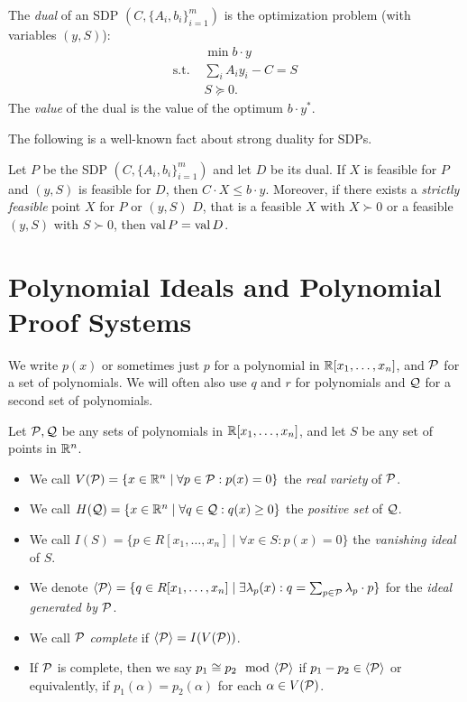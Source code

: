 \begin{definition}
The \emph{dual} of an SDP $(C, \{A_i, b_i\}_{i=1}^m)$ is the optimization problem (with variables $(y,S)$):
\begin{align*}
&\min b \cdot y \\
\text{s.t. }&\sum_i A_i y_i - C = S \\
&S \succeq 0.
\end{align*}
The \emph{value} of the dual is the value of the optimum $b \cdot y^*$.
\end{definition}
The following is a well-known fact about strong duality for SDPs.
\begin{lemma}\label{lem:duality}
Let $P$ be the SDP $(C, \{A_i, b_i\}_{i=1}^m)$ and let $D$ be its dual. If $X$ is feasible for $P$ and $(y,S)$ is feasible for $D$, then $C \cdot X \leq b \cdot y$. Moreover, if there exists a \emph{strictly feasible} point $X$ for $P$ or $(y,S)$ $D$, that is a feasible $X$ with $X \succ 0$ or a feasible $(y,S)$ with $S \succ 0$, then $\operatorname{val}{P} = \operatorname{val}{D}$.
\end{lemma}

\section{Polynomial Ideals and Polynomial Proof Systems}\label{sec:polyproofs}
We write $p(x)$ or sometimes just $p$ for a polynomial in $\mathbb R[x_1,\dots,x_n]$, and $\mathcal P$ for a set of polynomials.
We will often also use $q$ and $r$ for polynomials and $\mathcal Q$ for a second set of polynomials.
\begin{definition}
Let $\mathcal P,\mathcal Q$ be any sets of polynomials in $\mathbb R[x_1,\dots,x_n]$, and let $S$ be any set of points in $\mathbb R^n$.
\begin{itemize}
\item We call $V(\mathcal P) = \{x \in \mathbb R^n \mid \forall p \in \mathcal P: p(x) = 0\}$ the \emph{real variety} of $\mathcal P$.
\item We call $H(\mathcal Q) = \{x \in \mathbb R^n \mid \forall q \in \mathcal Q: q(x) \geq 0\}$ the \emph{positive set} of $\mathcal Q$.
\item We call $I(S) = \{p \in R[x_1,\dots,x_n] \mid \forall x \in S: p(x) = 0\}$ the \emph{vanishing ideal} of $S$.
\item We denote $\langle \mathcal P \rangle = \{q \in R[x_1,\dots,x_n] \mid \exists \lambda_p(x): q = \sum_{p \in \mathcal P} \lambda_p \cdot p\}$ for the \emph{ideal generated by $\mathcal P$}.
\item We call $\mathcal P$ \emph{complete} if $\langle \mathcal P \rangle = I(V(\mathcal P))$.
\item If $\mathcal P$ is complete, then we say $p_1 \cong p_2 \mod \gen{\cP}$ if $p_1 - p_2 \in \langle \mathcal P \rangle$ or equivalently, if $p_1(\alpha) = p_2(\alpha)$ for each $\alpha \in V(\mathcal P)$.
\end{itemize}
\end{definition}


